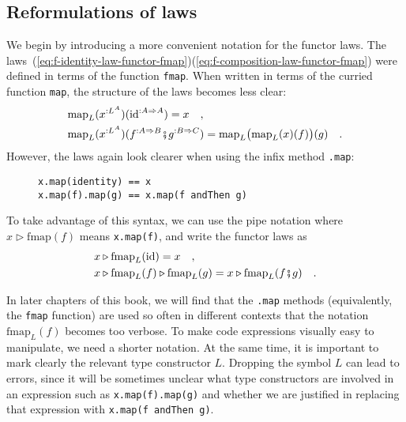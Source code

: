 \subsection{Reformulations of laws}

We begin by introducing a more convenient notation for the functor
laws. The laws~(\ref{eq:f-identity-law-functor-fmap})\textendash (\ref{eq:f-composition-law-functor-fmap})
were defined in terms of the function \lstinline!fmap!. When written
in terms of the curried function \lstinline!map!, the structure of
the laws becomes less clear:
\begin{align*}
 & \text{map}_{L}(x^{:L^{A}})(\text{id}^{:A\Rightarrow A})=x\quad,\\
 & \text{map}_{L}(x^{:L^{A}})(f^{:A\Rightarrow B}\bef g^{:B\Rightarrow C})=\text{map}_{L}\big(\text{map}_{L}(x)(f)\big)(g)\quad.
\end{align*}
However, the laws again look clearer when using the infix method \lstinline!.map!:

\begin{wrapfigure}{l}{0.4\columnwidth}%
\vspace{-0.8\baselineskip}
\begin{lstlisting}
x.map(identity) == x
x.map(f).map(g) == x.map(f andThen g)
\end{lstlisting}

\vspace{-0.5\baselineskip}
\end{wrapfigure}%
To take advantage of this syntax, we can use the pipe
notation where $x\triangleright\text{fmap}(f)$ means \lstinline!x.map(f)!,
and write the functor laws as
\begin{align*}
 & x\triangleright\text{fmap}_{L}(\text{id})=x\quad,\\
 & x\triangleright\text{fmap}_{L}(f)\triangleright\text{fmap}_{L}(g)=x\triangleright\text{fmap}_{L}(f\bef g)\quad.
\end{align*}

In later chapters of this book, we will find that the \lstinline!.map!
methods (equivalently, the \lstinline!fmap! function) are used so
often in different contexts that the notation $\text{fmap}_{L}(f)$
becomes too verbose. To make code expressions visually easy to manipulate,
we need a shorter notation. At the same time, it is important to mark
clearly the relevant type constructor $L$. Dropping the symbol $L$
can lead to errors, since it will be sometimes unclear what type constructors
are involved in an expression such as \lstinline!x.map(f).map(g)!
and whether we are justified in replacing that expression with \lstinline!x.map(f andThen g)!.

